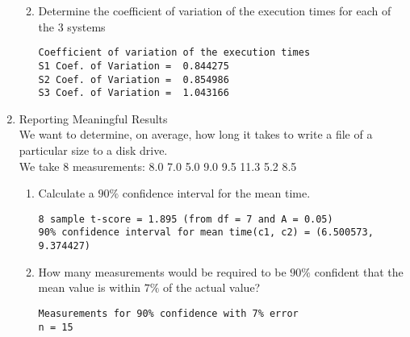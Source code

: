 \documentclass[11pt]{article}
\begin{document}
\begin{enumerate}[(1)]
\begin{enumerate}[a]
\begin{verbatim}
\end{verbatim}
\item Determine the coefficient of variation of the execution times for each of the 3 systems\\
\begin{verbatim}
Coefficient of variation of the execution times
S1 Coef. of Variation =  0.844275
S2 Coef. of Variation =  0.854986
S3 Coef. of Variation =  1.043166

\end{verbatim}
\end{enumerate}


\item Reporting Meaningful Results\\
We want to determine, on average, how long it takes to write a file of a particular size to a disk drive.\\
We take 8 measurements: 8.0 7.0 5.0 9.0 9.5 11.3 5.2 8.5 \\

\begin{enumerate}[label=\alph*]
\item Calculate a $90\%$ confidence interval for the mean time.\\
\begin{verbatim}
8 sample t-score = 1.895 (from df = 7 and A = 0.05)
90% confidence interval for mean time(c1, c2) = (6.500573, 9.374427)
\end{verbatim}
\item How many measurements would be required to be $90\%$ confident that the mean value is within $7\%$ of the actual value?\\
\begin{verbatim}
Measurements for 90% confidence with 7% error
n = 15
\end{verbatim}
\end{enumerate}

\end{enumerate}
\end{document}
